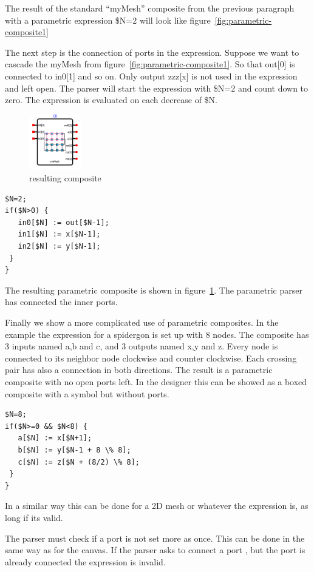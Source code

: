 The result of the standard ``myMesh'' composite from the previous paragraph with
a parametric expression \$N=2 will look like
figure~\ref{fig:parametric-composite1}

The next step is the connection of ports in the expression. Suppose we want to
cascade the myMesh from figure~\ref{fig:parametric-composite1}. So that out[0]
is connected to in0[1] and so on. Only output zzz[x] is not used in the
expression and left open. The parser will start the expression with \$N=2 and
count down to zero. The expression is evaluated on each decrease of \$N.

\begin{figure}
  \vspace{-20pt}
  \begin{center}
    \includegraphics[width=0.20\textwidth]{pictures/parametric-composite2}
  \caption{resulting composite}
  \label{fig:parametric-composite2}
  \end{center}
  \vspace{-30pt}
\end{figure}

\begin{lstlisting}
$N=2;
if($N>0) {
   in0[$N] := out[$N-1];
   in1[$N] := x[$N-1];
   in2[$N] := y[$N-1];
 }
}
\end{lstlisting}


The resulting parametric composite is shown in
figure~\ref{fig:parametric-composite2}. The parametric parser has connected the
inner ports.

Finally we show a more complicated use of parametric composites. In the example
the expression for a spidergon is set up with 8 nodes. The composite has 3
inputs named a,b and c, and 3 outputs named x,y and z. Every node is connected
to its neighbor node clockwise and counter clockwise. Each crossing pair has
also a connection in both directions. The result is a parametric composite with
no open ports left. In the designer this can be showed as a boxed composite with
a symbol but without ports.

\begin{lstlisting}
$N=8;
if($N>=0 && $N<8) {
   a[$N] := x[$N+1]; 
   b[$N] := y[$N-1 + 8 \% 8];
   c[$N] := z[$N + (8/2) \% 8];
 }
}
\end{lstlisting}

In a similar way this can be done for a 2D mesh or whatever the expression is,
as long if its valid.

The parser must check if a port is not set more as once. This can be done in the
same way as for the canvas. If the parser asks to connect a port , but the port
is already connected the expression is invalid.



\newpage